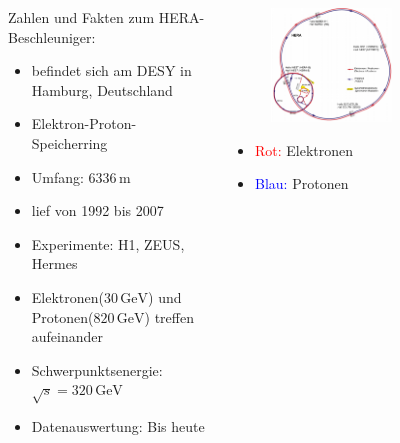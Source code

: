 \documentclass[aspectratio=1610, 9pt]{beamer}
\begin{document}
\begin{frame}
  \begin{columns}
    \begin{column}{0.4\textwidth}
      Zahlen und Fakten zum HERA-Beschleuniger:
      \begin{itemize}
        \item{befindet sich am DESY in Hamburg, Deutschland}
        \item{Elektron-Proton-Speicherring}
        \item{Umfang: $6336 \,\mathrm{m}$}
        \item{lief von 1992 bis 2007}
        \item{Experimente: H1, ZEUS, Hermes}
        \item{Elektronen($30 \,\mathrm{GeV}$) und Protonen($820 \,\mathrm{GeV}$) treffen aufeinander}
        \item{Schwerpunktsenergie: $\sqrt{s} = 320 \,\mathrm{GeV} $}
        \item{Datenauswertung: Bis heute}
      \end{itemize}
    \end{column}

    \begin{column}{0.6\textwidth}
      \begin{figure}
        \centering
        \includegraphics[width=0.6\textwidth]{images/hera.png}
      \end{figure}
      \centering
      \begin{itemize}
        \item{ \textcolor{red}{Rot:} Elektronen }
        \item{ \textcolor{blue}{Blau:} Protonen }
      \end{itemize}
    \end{column}
 \end{columns}
\end{frame}
\end{document}

